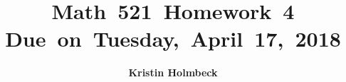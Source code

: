


\newcommand{\hmwkTitle}{Homework\ 4} %
\newcommand{\hmwkDueDate}{Tuesday,\ April\ 17,\ 2018} %
\newcommand{\hmwkClass}{Math\ 521} %
\newcommand{\hmwkAuthorName}{Kristin Holmbeck} %

\DeclareMathOperator*{\argmax}{arg\,max}
\DeclareMathOperator*{\argmin}{arg\,min}


\title{
\textmd{\textbf{\hmwkClass \ \hmwkTitle}}\\
\normalsize\vspace{0.1in}\small{Due\ on\ \hmwkDueDate}\\
\vspace{0.1in}
\vspace{0.2in}
}

\author{\textbf{\hmwkAuthorName}}
\date{} %




\maketitle


\vspace{0.75in}
\tableofcontents
\listoffigures
\newpage



